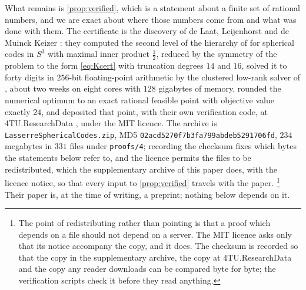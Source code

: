 \documentclass[11pt,reqno]{amsart}
\renewcommand{\_}{\origunderscore\allowbreak}
\numberwithin{equation}{section}
\theoremstyle{plain}
\theoremstyle{definition}
\theoremstyle{remark}
\begin{document}
What remains is \cref{prop:verified}, which is a statement about a finite
set of rational numbers, and we are exact about where those numbers come
from and what was done with them. The certificate is the discovery of
de Laat, Leijenhorst and de Muinck Keizer \cite{LLM24}: they computed the
second level of the hierarchy of \cite{dLV15} for spherical codes in
$S^3$ with maximal inner product $\tfrac12$, reduced by the symmetry of
the problem to the form \eqref{eq:Kcert} with truncation degrees $14$
and $16$, solved it to forty digits in $256$-bit floating-point
arithmetic by the clustered low-rank solver of \cite{LdL24}, about two
weeks on eight cores with $128$ gigabytes of memory, rounded the
numerical optimum to an exact rational feasible point with objective
value exactly $24$, and deposited that point, with their own
verification code, at 4TU.ResearchData \cite{LLM24data}, under the MIT
licence. The archive is \texttt{LasserreSphericalCodes.zip}, MD5
\texttt{02acd5270f7b3fa799abdeb5291706fd}, $234$ megabytes in $331$ files
under \texttt{proofs/4\_24}; recording the checksum fixes which bytes the
statements below refer to, and the licence permits the files to be
redistributed, which the supplementary archive of this paper
\cite{D4Zenodo} does, with the licence notice, so that every input to
\cref{prop:verified} travels with the paper.%
\footnote{The point of redistributing rather than pointing is that a
  proof which depends on a file should not depend on a server. The MIT
  licence asks only that its notice accompany the copy, and it does.
  The checksum is recorded so that the copy in the supplementary
  archive, the copy at 4TU.ResearchData and the copy any reader
  downloads can be compared byte for byte; the verification scripts
  check it before they read anything.} Their paper is, at the time
of writing, a preprint; nothing below depends on it.
\end{document}
